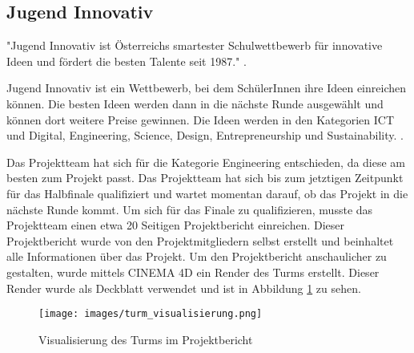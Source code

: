 \subsection{Jugend Innovativ}

"Jugend Innovativ ist Österreichs smartester Schulwettbewerb für innovative Ideen und fördert die besten Talente seit 1987." .

Jugend Innovativ ist ein Wettbewerb, bei dem SchülerInnen ihre Ideen einreichen können. Die besten Ideen werden dann in die nächste Runde ausgewählt und können dort weitere Preise gewinnen. Die Ideen werden in den Kategorien ICT und Digital, Engineering, Science, Design, Entrepreneurship und Sustainability. .

Das Projektteam hat sich für die Kategorie Engineering entschieden, da diese am besten zum Projekt passt. Das Projektteam hat sich bis zum jetztigen Zeitpunkt für das Halbfinale qualifiziert und wartet momentan darauf, ob das Projekt in die nächste Runde kommt. Um sich für das Finale zu qualifizieren, musste das Projektteam einen etwa 20 Seitigen Projektbericht einreichen. Dieser Projektbericht wurde von den Projektmitgliedern selbst erstellt und beinhaltet alle Informationen über das Projekt. Um den Projektbericht anschaulicher zu gestalten, wurde mittels CINEMA 4D ein Render des Turms erstellt. Dieser Render wurde als Deckblatt verwendet und ist in Abbildung \ref{fig:turm_visualisierung} zu sehen.

\begin{figure}[H]
    \centering
    \texttt{[image: images/turm\_visualisierung.png]}
    \caption{Visualisierung des Turms im Projektbericht}
    \label{fig:turm_visualisierung}
\end{figure}